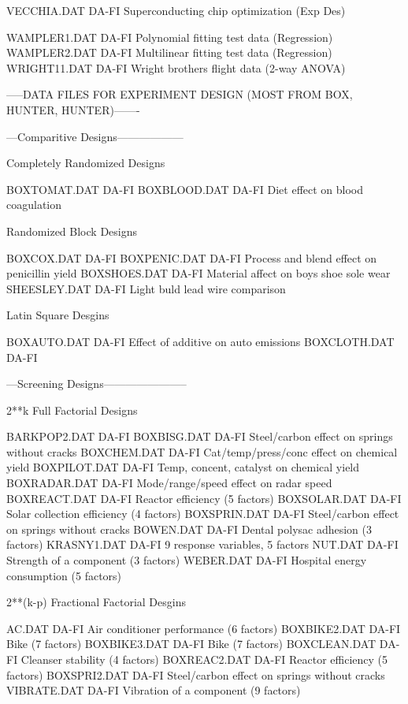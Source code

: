 VECCHIA.DAT                 DA-FI Superconducting chip optimization (Exp Des)

WAMPLER1.DAT                DA-FI Polynomial fitting test data (Regression)
WAMPLER2.DAT                DA-FI Multilinear fitting test data (Regression)
WRIGHT11.DAT                DA-FI Wright brothers flight data (2-way ANOVA)

-----DATA FILES FOR EXPERIMENT DESIGN (MOST FROM BOX, HUNTER, HUNTER)-------

---Comparitive Designs------------------

Completely Randomized Designs

BOXTOMAT.DAT                DA-FI 
BOXBLOOD.DAT                DA-FI Diet effect on blood coagulation

Randomized Block Designs

BOXCOX.DAT                  DA-FI
BOXPENIC.DAT                DA-FI Process and blend effect on penicillin yield
BOXSHOES.DAT                DA-FI Material affect on boys shoe sole wear
SHEESLEY.DAT                DA-FI Light buld lead wire comparison

Latin Square Desgins 

BOXAUTO.DAT                 DA-FI Effect of additive on auto emissions 
BOXCLOTH.DAT                DA-FI 

---Screening Designs-----------------------

2**k Full Factorial Designs

BARKPOP2.DAT                DA-FI
BOXBISG.DAT                 DA-FI Steel/carbon effect on springs without cracks
BOXCHEM.DAT                 DA-FI Cat/temp/press/conc effect on chemical yield
BOXPILOT.DAT                DA-FI Temp, concent, catalyst on chemical yield
BOXRADAR.DAT                DA-FI Mode/range/speed effect on radar speed
BOXREACT.DAT                DA-FI Reactor efficiency (5 factors)
BOXSOLAR.DAT                DA-FI Solar collection efficiency (4 factors)
BOXSPRIN.DAT                DA-FI Steel/carbon effect on springs without cracks
BOWEN.DAT                   DA-FI Dental polysac adhesion (3 factors)
KRASNY1.DAT                 DA-FI 9 response variables, 5 factors
NUT.DAT                     DA-FI Strength of a component (3 factors)
WEBER.DAT                   DA-FI Hospital energy consumption (5 factors)

2**(k-p) Fractional Factorial Desgins

AC.DAT                      DA-FI Air conditioner performance (6 factors)
BOXBIKE2.DAT                DA-FI Bike (7 factors)
BOXBIKE3.DAT                DA-FI Bike (7 factors)
BOXCLEAN.DAT                DA-FI Cleanser stability (4 factors)
BOXREAC2.DAT                DA-FI Reactor efficiency (5 factors)
BOXSPRI2.DAT                DA-FI Steel/carbon effect on springs without cracks
VIBRATE.DAT                 DA-FI Vibration of a component (9 factors)

